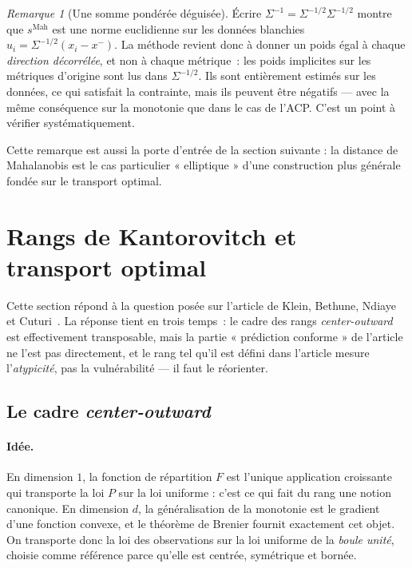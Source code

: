\documentclass[11pt,a4paper]{article}
\theoremstyle{definition}
\theoremstyle{remark}
\newtheorem{remarque}{Remarque}[section]
\begin{document}
\bigskip

\begin{remarque}[Une somme pondérée déguisée]
  Écrire $\Sigma^{-1} = \Sigma^{-1/2}\Sigma^{-1/2}$ montre que $s^{\mathrm{Mah}}$ est une norme
  euclidienne sur les données blanchies $u_i = \Sigma^{-1/2}(x_i - x^{-})$. La méthode revient donc
  à donner un poids égal à chaque \emph{direction décorrélée}, et non à chaque métrique~: les poids
  implicites sur les métriques d'origine sont lus dans $\Sigma^{-1/2}$. Ils sont entièrement
  estimés sur les données, ce qui satisfait la contrainte, mais ils peuvent être négatifs --- avec
  la même conséquence sur la monotonie que dans le cas de l'ACP. C'est un point à vérifier
  systématiquement.
\end{remarque}

\bigskip

Cette remarque est aussi la porte d'entrée de la section suivante : la distance de Mahalanobis
est le cas particulier « elliptique » d'une construction plus générale fondée sur le transport
optimal.

\bigskip

\section{Rangs de Kantorovitch et transport optimal}
\label{sec:ot}

\medskip

Cette section répond à la question posée sur l'article de Klein, Bethune, Ndiaye et
Cuturi~\cite{klein2025}. La réponse tient en trois temps~: le cadre des rangs \emph{center-outward}
est effectivement transposable, mais la partie « prédiction conforme » de l'article ne l'est pas
directement, et le rang tel qu'il est défini dans l'article mesure l'\emph{atypicité}, pas la
vulnérabilité --- il faut le réorienter.

\subsection{Le cadre \emph{center-outward}}

\medskip

\paragraph{Idée.} En dimension $1$, la fonction de répartition $F$ est l'unique application
croissante qui transporte la loi $P$ sur la loi uniforme : c'est ce qui fait du rang une notion
canonique. En dimension $d$, la généralisation de la monotonie est le gradient d'une fonction
convexe, et le théorème de Brenier fournit exactement cet objet. On transporte donc la loi des
observations sur la loi uniforme de la \emph{boule unité}, choisie comme référence parce qu'elle
est centrée, symétrique et bornée.
\end{document}
